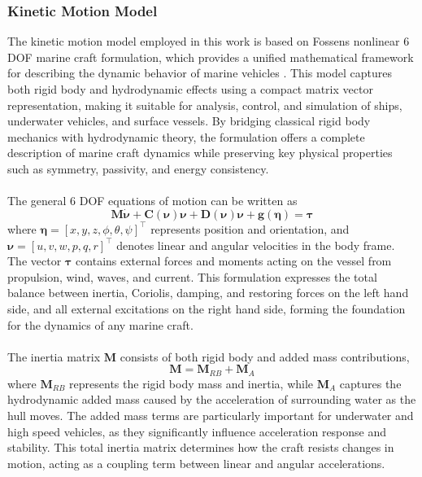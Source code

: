 \subsubsection{Kinetic Motion Model}
The kinetic motion model employed in this work is based on Fossens nonlinear 6 DOF marine craft formulation, which provides a unified mathematical framework for describing the dynamic behavior of marine vehicles \cite{fossen_marine_craft_model}. This model captures both rigid body and hydrodynamic effects using a compact matrix vector representation, making it suitable for analysis, control, and simulation of ships, underwater vehicles, and surface vessels. By bridging classical rigid body mechanics with hydrodynamic theory, the formulation offers a complete description of marine craft dynamics while preserving key physical properties such as symmetry, passivity, and energy consistency.
\\ \\
The general 6 DOF equations of motion can be written as
$$
    \mathbf{M}\dot{\boldsymbol{\nu}} + \mathbf{C}(\boldsymbol{\nu})\boldsymbol{\nu} + \mathbf{D}(\boldsymbol{\nu})\boldsymbol{\nu} + \mathbf{g}(\boldsymbol{\eta}) = \boldsymbol{\tau}
$$
where $\boldsymbol{\eta} = [x, y, z, \phi, \theta, \psi]^\top$ represents position and orientation, and $\boldsymbol{\nu} = [u, v, w, p, q, r]^\top$ denotes linear and angular velocities in the body frame. The vector $\boldsymbol{\tau}$ contains external forces and moments acting on the vessel from propulsion, wind, waves, and current. This formulation expresses the total balance between inertia, Coriolis, damping, and restoring forces on the left hand side, and all external excitations on the right hand side, forming the foundation for the dynamics of any marine craft.  
\\ \\
The inertia matrix $\mathbf{M}$ consists of both rigid body and added mass contributions,
$$
    \mathbf{M} = \mathbf{M}_{RB} + \mathbf{M}_A
$$
where $\mathbf{M}_{RB}$ represents the rigid body mass and inertia, while $\mathbf{M}_A$ captures the hydrodynamic added mass caused by the acceleration of surrounding water as the hull moves. The added mass terms are particularly important for underwater and high speed vehicles, as they significantly influence acceleration response and stability. This total inertia matrix determines how the craft resists changes in motion, acting as a coupling term between linear and angular accelerations.  
\\ \\

